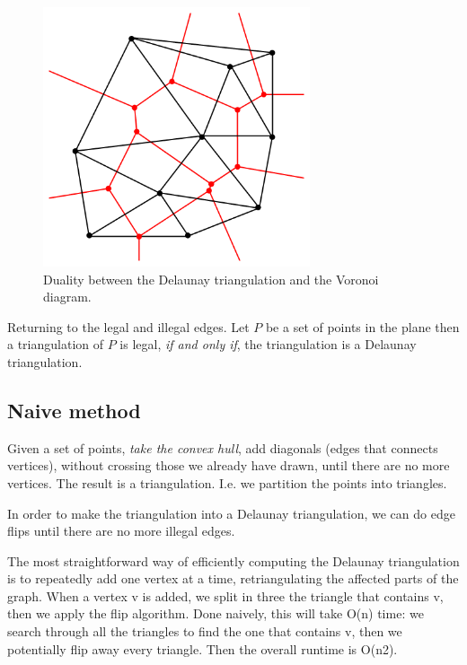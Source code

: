 \documentclass[10pt]{article}
\begin{document}
\begin{figure}[ht]
\centering
\includegraphics[width=0.7\textwidth]{figures/fig8.png}
\caption{Duality between the Delaunay triangulation and the Voronoi diagram.}
\label{fig8}
\end{figure}

Returning to the legal and illegal edges. Let $P$ be a set of points in the plane then a triangulation of $P$ is legal, \emph{if and only if}, the triangulation is a Delaunay triangulation.


\subsection{Naive method} %
\label{sub:naive_method}
Given a set of points, \emph{take the convex hull}, add diagonals (edges that connects vertices), without crossing those we already have drawn, until there are no more vertices. The result is a triangulation. I.e. we partition the points into triangles.

In order to make the triangulation into a Delaunay triangulation, we can do edge flips until there are no more illegal edges.


The most straightforward way of efficiently computing the Delaunay triangulation is to repeatedly add one vertex at a time, retriangulating the affected parts of the graph. When a vertex v is added, we split in three the triangle that contains v, then we apply the flip algorithm. Done naively, this will take O(n) time: we search through all the triangles to find the one that contains v, then we potentially flip away every triangle. Then the overall runtime is O(n2).
\end{document}
